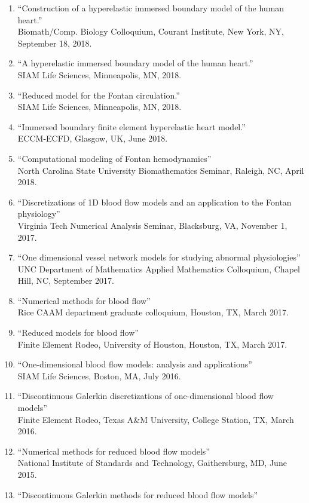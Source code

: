 \documentclass{article} %
\begin{document}
\begin{enumerate}
\item ``Construction of a hyperelastic immersed boundary model of the human heart.'' \\Biomath/Comp. Biology Colloquium, Courant Institute, New York, NY, September 18, 2018.
\item ``A hyperelastic immersed boundary model of the human heart.''\\ SIAM Life Sciences, Minneapolis, MN, 2018.
\item ``Reduced model for the Fontan circulation.''\\ SIAM Life Sciences, Minneapolis, MN, 2018.
\item ``Immersed boundary finite element hyperelastic heart model.'' \\
ECCM-ECFD, Glasgow, UK, June 2018.
\item ``Computational modeling of Fontan hemodynamics'' \\
North Carolina State University Biomathematics Seminar, Raleigh, NC, April 2018.
\item ``Discretizations of 1D blood flow models and an application to the Fontan physiology'' \\
Virginia Tech Numerical Analysis Seminar, Blacksburg, VA, November 1, 2017.
\item ``One dimensional vessel network models for studying abnormal physiologies'' \\
UNC Department of Mathematics Applied Mathematics Colloquium, Chapel Hill, NC, September 2017.
\item ``Numerical methods for blood flow'' \\
Rice CAAM department graduate colloquium, Houston, TX, March 2017.
\item ``Reduced models for blood flow'' \\
Finite Element Rodeo, University of Houston, Houston, TX, March 2017.
\item ``One-dimensional blood flow models: analysis and applications'' \\
SIAM Life Sciences, Boston, MA, July 2016.
\item ``Discontinuous Galerkin discretizations of one-dimensional blood flow models'' \\ 
Finite Element Rodeo, Texas A\&M University, College Station, TX, March 2016.
\item ``Numerical methods for reduced blood flow models'' \\
National Institute of Standards and Technology, Gaithersburg, MD, June 2015.
\item ``Discontinuous Galerkin methods for reduced blood flow models'' \\

\end{enumerate}
\end{document}
